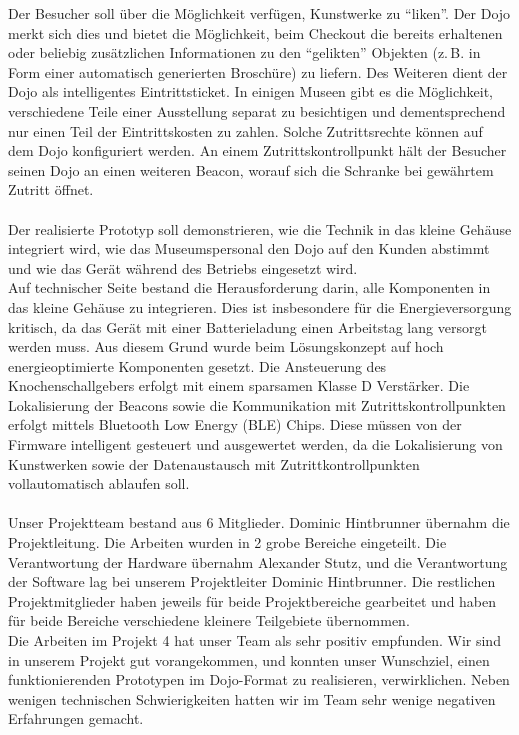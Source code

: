 Der Besucher soll über die Möglichkeit verfügen, Kunstwerke zu ``liken''. Der Dojo merkt sich dies und bietet die Möglichkeit, beim Checkout die bereits erhaltenen oder beliebig zusätzlichen Informationen zu den ``gelikten'' Objekten (z.\,B. in Form einer automatisch generierten Broschüre) zu liefern.
Des Weiteren dient der Dojo als intelligentes Eintrittsticket. In einigen Museen gibt es die Möglichkeit, verschiedene Teile einer Ausstellung separat zu besichtigen und dementsprechend nur einen Teil der Eintrittskosten zu zahlen. Solche Zutrittsrechte können auf dem Dojo konfiguriert werden. An einem Zutrittskontrollpunkt hält der Besucher seinen Dojo an einen weiteren Beacon, worauf sich die Schranke bei gewährtem Zutritt öffnet.\\\\
Der realisierte Prototyp soll demonstrieren, wie die Technik in das kleine Gehäuse integriert wird, wie das Museumspersonal den Dojo auf den Kunden abstimmt und wie das Gerät während des Betriebs eingesetzt wird.\\
Auf technischer Seite bestand die Herausforderung darin, alle Komponenten in das kleine Gehäuse zu integrieren. Dies ist insbesondere für die Energieversorgung kritisch, da das Gerät mit einer Batterieladung einen Arbeitstag lang versorgt werden muss. Aus diesem Grund wurde beim Lösungskonzept auf hoch energieoptimierte Komponenten gesetzt. Die Ansteuerung des Knochenschallgebers erfolgt mit einem sparsamen Klasse D Verstärker. Die Lokalisierung der Beacons sowie die Kommunikation mit Zutrittskontrollpunkten erfolgt mittels Bluetooth Low Energy (BLE) Chips. Diese müssen von der Firmware intelligent gesteuert und ausgewertet werden, da die Lokalisierung von Kunstwerken sowie der Datenaustausch mit Zutrittkontrollpunkten vollautomatisch ablaufen soll.\\\\
Unser Projektteam bestand aus 6 Mitglieder. Dominic Hintbrunner übernahm die Projektleitung. Die Arbeiten wurden in 2 grobe Bereiche eingeteilt. Die Verantwortung der Hardware übernahm Alexander Stutz, und die Verantwortung der Software lag bei unserem Projektleiter Dominic Hintbrunner. Die restlichen Projektmitglieder haben jeweils für beide Projektbereiche gearbeitet und haben für beide Bereiche verschiedene kleinere Teilgebiete übernommen.\\
Die Arbeiten im Projekt 4 hat unser Team als sehr positiv empfunden. Wir sind in unserem Projekt gut vorangekommen, und konnten unser Wunschziel, einen funktionierenden Prototypen im Dojo-Format zu realisieren, verwirklichen. Neben wenigen technischen Schwierigkeiten hatten wir im Team sehr wenige negativen Erfahrungen gemacht.